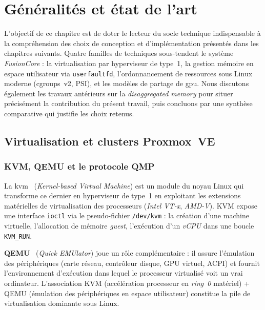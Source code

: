 \chapter{Généralités et état de l'art}
\label{chap:etat-art}


L'objectif de ce chapitre est de doter le lecteur du socle technique indispensable à la compréhension des choix de conception et d'implémentation présentés dans les chapitres suivants. Quatre familles de techniques sous-tendent le système \emph{FusionCore} : la virtualisation par hyperviseur de type~1, la gestion mémoire en espace utilisateur via \texttt{userfaultfd}, l'ordonnancement de ressources sous Linux moderne (cgroups~v2, PSI), et les modèles de partage de \acrshort{gpu}. Nous discutons également les travaux antérieurs sur la \emph{disaggregated memory} pour situer précisément la contribution du présent travail, puis concluons par une synthèse comparative qui justifie les choix retenus.

\section{Virtualisation et clusters Proxmox~VE}
\label{sec:virt-proxmox}

\subsection{KVM, QEMU et le protocole QMP}

La \acrshort{kvm}~\cite{kvm_doc} (\emph{Kernel-based Virtual Machine}) est un module du noyau Linux qui transforme ce dernier en hyperviseur de type~1 en exploitant les extensions matérielles de virtualisation des processeurs (\emph{Intel VT-x}, \emph{AMD-V}). KVM expose une interface \texttt{ioctl} via le pseudo-fichier \texttt{/dev/kvm} : la création d'une machine virtuelle, l'allocation de mémoire \emph{guest}, l'exécution d'un \emph{vCPU} dans une boucle \texttt{KVM\_RUN}.

\textbf{QEMU}~\cite{qemu_doc} (\emph{Quick EMUlator}) joue un rôle complémentaire : il assure l'émulation des périphériques (carte réseau, contrôleur disque, GPU virtuel, ACPI) et fournit l'environnement d'exécution dans lequel le processeur virtualisé voit un \og{}vrai\fg{} ordinateur. L'association KVM (accélération processeur en \emph{ring~0} matériel) + QEMU (émulation des périphériques en espace utilisateur) constitue la pile de virtualisation dominante sous Linux.

